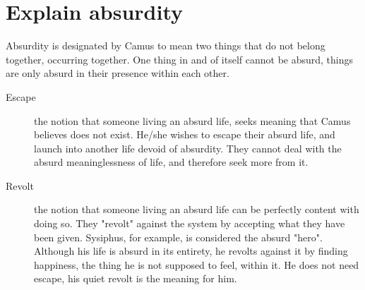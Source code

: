 \section{Explain absurdity}
Absurdity is designated by Camus to mean two things that do not belong together,
occurring together. One thing in and of itself cannot be absurd, things are only
absurd in their presence within each other.

\begin{description}
  \item[Escape] the notion that someone living an absurd life, seeks meaning
    that Camus believes does not exist. He/she wishes to escape their absurd
    life, and launch into another life devoid of absurdity. They cannot deal
    with the absurd meaninglessness of life, and therefore seek more from it.
  \item[Revolt] the notion that someone living an absurd life can be perfectly
    content with doing so. They "revolt" against the system by accepting what
    they have been given. Sysiphus, for example, is considered the absurd
    "hero". Although his life is absurd in its entirety, he revolts against it
    by finding happiness, the thing he is not supposed to feel, within it. He
    does not need escape, his quiet revolt is the meaning for him.
\end{description}
